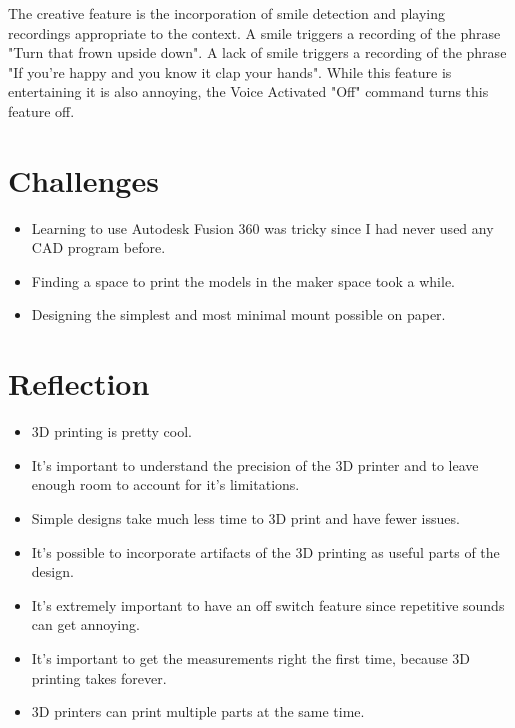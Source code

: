 \documentclass{article}
\begin{document}
	The creative feature is the incorporation of smile detection and playing recordings appropriate to the context.
	A smile triggers a recording of the phrase "Turn that frown upside down".
	A lack of smile triggers a recording of the phrase "If you're happy and you know it clap your hands".
 	While this feature is entertaining it is also annoying, the Voice Activated "Off" command turns this feature off.
	
	
	\section{Challenges}
	\begin{itemize}
		\item Learning to use Autodesk Fusion 360 was tricky since I had never used any CAD program before.
		\item Finding a space to print the models in the maker space took a while.
		\item Designing the simplest and most minimal mount possible on paper.
	\end{itemize}
	
	
	\section{Reflection}
	\begin{itemize}
		\item 3D printing is pretty cool.
		\item It's important to understand the precision of the 3D printer and to leave enough room to account for it's limitations.
		\item Simple designs take much less time to 3D print and have fewer issues.
		\item It's possible to incorporate artifacts of the 3D printing as useful parts of the design.
		\item It's extremely important to have an off switch feature since repetitive sounds can get annoying.
		\item It's important to get the measurements right the first time, because 3D printing takes forever.
		\item 3D printers can print multiple parts at the same time.
	\end{itemize}
	
\end{document}
